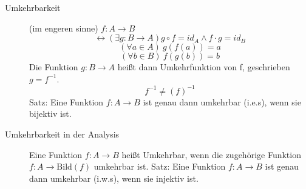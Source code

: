 \begin{description}
    \item[Umkehrbarkeit] (im engeren sinne) $f : A \longrightarrow B$
    $$\leftrightarrow (\exists g : B \longrightarrow A) g \circ f = id_A \wedge f \cdot g = id_B$$
    $$(\forall a \in A)\ g(f(a)) = a$$
    $$(\forall b \in B)\ f(g(b)) = b$$
    Die Funktion $g : B \longrightarrow A$ heißt dann Umkehrfunktion von f, geschrieben $g = f^{-1}$.
    $$f^{-1} \not = (f)^{-1}$$
    Satz: Eine Funktion $f : A \longrightarrow B$ ist genau dann umkehrbar (i.e.s), wenn sie bijektiv ist.
    \item[Umkehrbarkeit in der Analysis] Eine Funktion $f : A \longrightarrow B$ heißt Umkehrbar, wenn die zugehörige Funktion $f : A \longrightarrow \textrm{Bild}(f)$ umkehrbar ist.
    Satz: Eine Funktion $f : A \longrightarrow B$ ist genau dann umkehrbar (i.w.s), wenn sie injektiv ist.
\end{description}
